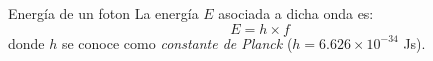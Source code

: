 \begin{infocard}{Energía de un foton}%
    La energía $E$ asociada a dicha onda es:
    \begin{equation}
        E=h \times f
    \end{equation}
    donde $h$ se conoce como \emph{constante de Planck} ($h=6.626 \times 10^{-34}$ Js).
\end{infocard}%